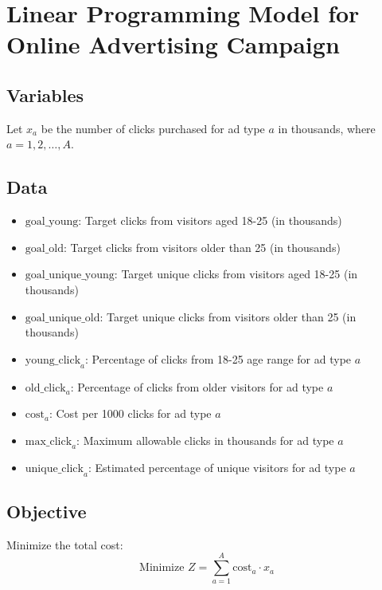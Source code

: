 \documentclass{article}
\begin{document}
\section*{Linear Programming Model for Online Advertising Campaign}

\subsection*{Variables}
Let \( x_a \) be the number of clicks purchased for ad type \( a \) in thousands, where \( a = 1, 2, \ldots, A \).

\subsection*{Data}
\begin{itemize}
    \item \( \text{goal\_young} \): Target clicks from visitors aged 18-25 (in thousands)
    \item \( \text{goal\_old} \): Target clicks from visitors older than 25 (in thousands)
    \item \( \text{goal\_unique\_young} \): Target unique clicks from visitors aged 18-25 (in thousands)
    \item \( \text{goal\_unique\_old} \): Target unique clicks from visitors older than 25 (in thousands)
    \item \( \text{young\_click}_a \): Percentage of clicks from 18-25 age range for ad type \( a \)
    \item \( \text{old\_click}_a \): Percentage of clicks from older visitors for ad type \( a \)
    \item \( \text{cost}_a \): Cost per 1000 clicks for ad type \( a \)
    \item \( \text{max\_click}_a \): Maximum allowable clicks in thousands for ad type \( a \)
    \item \( \text{unique\_click}_a \): Estimated percentage of unique visitors for ad type \( a \)
\end{itemize}

\subsection*{Objective}
Minimize the total cost:
\[
\text{Minimize } Z = \sum_{a=1}^{A} \text{cost}_a \cdot x_a
\]
\end{document}
